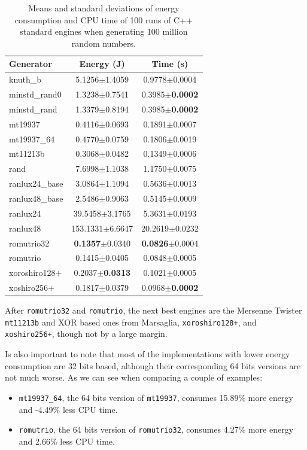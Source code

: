 \documentclass[sigconf]{acmart}
\begin{document}
\begin{table}
\centering
\caption{Means and standard deviations of energy consumption and CPU time of 100 runs of C++ standard engines when generating 100 million random numbers.}
\begin{tabular}{lcc}
\toprule
Generator & Energy (J) & Time (s) \\
\midrule
knuth\_b & 5.1256$\pm$1.4059 & 0.9778$\pm$0.0004 \\
minstd\_rand0 & 1.3238$\pm$0.7541 & 0.3985$\pm$\textbf{0.0002} \\
minstd\_rand & 1.3379$\pm$0.8194 & 0.3985$\pm$\textbf{0.0002} \\
mt19937 & 0.4116$\pm$0.0693 & 0.1891$\pm$0.0007 \\
mt19937\_64 & 0.4770$\pm$0.0759 & 0.1806$\pm$0.0019 \\
mt11213b & 0.3068$\pm$0.0482 & 0.1349$\pm$0.0006 \\
rand & 7.6998$\pm$1.1038 & 1.1750$\pm$0.0075 \\
ranlux24\_base & 3.0864$\pm$1.1094 & 0.5636$\pm$0.0013 \\
ranlux48\_base & 2.5486$\pm$0.9063 & 0.5145$\pm$0.0009 \\
ranlux24 & 39.5458$\pm$3.1765 & 5.3631$\pm$0.0193 \\
ranlux48 & 153.1331$\pm$6.6647 & 20.2619$\pm$0.0232 \\
romutrio32 & \textbf{0.1357}$\pm$0.0340 & \textbf{0.0826}$\pm$0.0004 \\
romutrio & 0.1415$\pm$0.0405 & 0.0848$\pm$0.0005 \\
xoroshiro128+ & 0.2037$\pm$\textbf{0.0313} & 0.1021$\pm$0.0005 \\
xoshiro256+ & 0.1817$\pm$0.0379 & 0.0968$\pm$\textbf{0.0002} \\
\bottomrule
\end{tabular}
\label{tab:pkg}
\end{table}

After \texttt{romutrio32} and \texttt{romutrio}, the next best engines are the Mersenne Twister \texttt{mt11213b} and XOR based ones from Marsaglia, \texttt{xoroshiro128+}, and \texttt{xoshiro256+}, though not by a large margin.

Is also important to note that most of the implementations with lower energy consumption are 32 bits based, although their corresponding 64 bits versions are not much worse. As we can see when comparing a couple of examples:
\begin{itemize}
\item \texttt{mt19937\_64}, the 64 bits version of \texttt{mt19937}, consumes 15.89\% more energy and -4.49\% less CPU time.
\item \texttt{romutrio}, the 64 bits version of \texttt{romutrio32}, consumes 4.27\% more energy and 2.66\% less CPU time.
\end{itemize}
\end{document}
